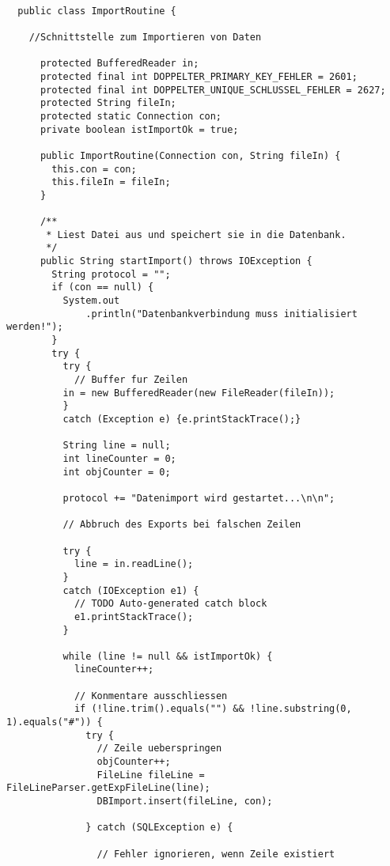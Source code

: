 \begin{lstlisting}

  public class ImportRoutine {

    //Schnittstelle zum Importieren von Daten

      protected BufferedReader in;
      protected final int DOPPELTER_PRIMARY_KEY_FEHLER = 2601;
      protected final int DOPPELTER_UNIQUE_SCHLUSSEL_FEHLER = 2627;
      protected String fileIn;
      protected static Connection con;
      private boolean istImportOk = true;

      public ImportRoutine(Connection con, String fileIn) {
        this.con = con;
        this.fileIn = fileIn;
      }

      /**
       * Liest Datei aus und speichert sie in die Datenbank.
       */
      public String startImport() throws IOException {
        String protocol = "";
        if (con == null) {
          System.out
              .println("Datenbankverbindung muss initialisiert werden!");
        }
        try {
          try {
            // Buffer fur Zeilen
          in = new BufferedReader(new FileReader(fileIn));
          }
          catch (Exception e) {e.printStackTrace();}

          String line = null;
          int lineCounter = 0;
          int objCounter = 0;

          protocol += "Datenimport wird gestartet...\n\n";

          // Abbruch des Exports bei falschen Zeilen

          try {
            line = in.readLine();
          }
          catch (IOException e1) {
            // TODO Auto-generated catch block
            e1.printStackTrace();
          }

          while (line != null && istImportOk) {
            lineCounter++;

            // Konmentare ausschliessen
            if (!line.trim().equals("") && !line.substring(0, 1).equals("#")) {
              try {
                // Zeile ueberspringen
                objCounter++;
                FileLine fileLine = FileLineParser.getExpFileLine(line);
                DBImport.insert(fileLine, con);

              } catch (SQLException e) {

                // Fehler ignorieren, wenn Zeile existiert


\end{lstlisting}
